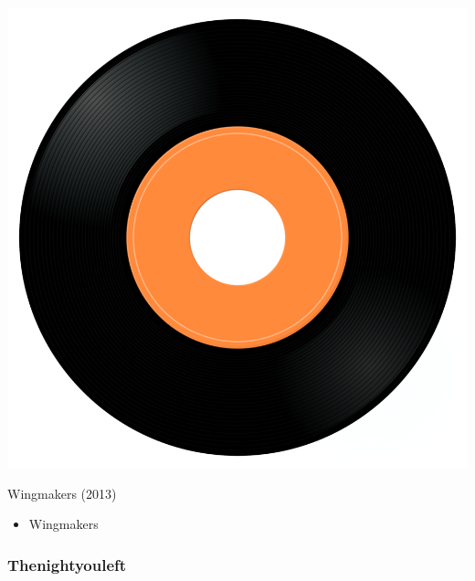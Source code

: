 \begin{minipage}[t]{0.25\textwidth}
\captionsetup{type=figure}
\includegraphics[width=\textwidth]{Images/cover.png}
\caption*{Wingmakers (2013)}
\end{minipage}
\begin{minipage}[t]{0.25\textwidth}\vspace{0pt}
\begin{itemize}[nosep,leftmargin=1em,labelwidth=*,align=left]
	\setlength{\itemsep}{0pt}
	\item Wingmakers
\end{itemize}
\end{minipage}

\subsubsection{Thenightyouleft}

